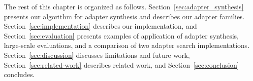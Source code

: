 The rest of this chapter is organized as follows.
%
Section~\ref{sec:adapter_synthesis} presents our algorithm for adapter synthesis and describes our adapter families.
%
Section~\ref{sec:implementation} describes our implementation, and
Section~\ref{sec:evaluation} presents examples of application of adapter synthesis, large-scale evaluations, and a comparison of two adapter search implementations.
%
Section~\ref{sec:discussion} discusses limitations and future work,
Section~\ref{sec:related-work} describes related work, and
Section~\ref{sec:conclusion} concludes.
% 
%
%    
%    
